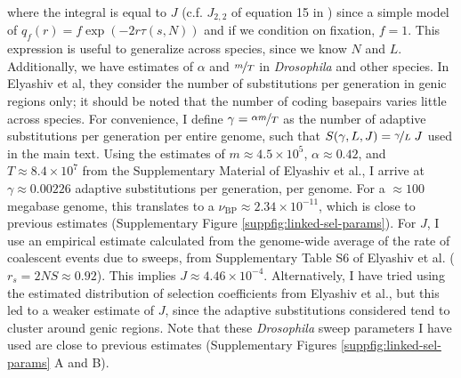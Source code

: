 \documentclass[11pt]{article}
\begin{document}
where the integral is equal to $J$ (c.f. $J_{2,2}$ of equation 15 in
\cite{Coop2012-cd}) since a simple model of $q_f(r) = f \exp(- 2r \tau(s, N))$
and if we condition on fixation, $f = 1$. This expression is useful to
generalize across species, since we know $N$ and $L$. Additionally, we have
estimates of $\alpha$ and $\nicefrac{m}{T}$ in \emph{Drosophila} and other
species. In Elyashiv et al, they consider the number of substitutions per
generation in genic regions only; it should be noted that the number of coding
basepairs varies little across species. For convenience, I define $\gamma =
\nicefrac{\alpha m}{T}$ as the number of adaptive substitutions per generation
per entire genome, such that $S(\gamma, L, J) = \nicefrac{\gamma}{L} \; J$ used
in the main text. Using the estimates of $m \approx 4.5 \times 10^{5}$, $\alpha
\approx 0.42$, and $T \approx 8.4 \times 10^{7}$ from the Supplementary
Material of Elyashiv et al., I arrive at $\gamma \approx 0.00226$ adaptive
substitutions per generation, per genome. For a $\approx 100$ megabase genome,
this translates to a $\nu_\text{BP} \approx 2.34 \times 10^{-11}$, which is
close to previous estimates (Supplementary Figure
\ref{suppfig:linked-sel-params}). For $J$, I use an empirical estimate
calculated from the genome-wide average of the rate of coalescent events due to
sweeps, from Supplementary Table S6 of Elyashiv et al. ($r_s = 2NS \approx
0.92$). This implies $J \approx 4.46 \times 10^{-4}$. Alternatively, I have
tried using the estimated distribution of selection coefficients from Elyashiv
et al., but this led to a weaker estimate of $J$, since the adaptive
substitutions considered tend to cluster around genic regions. Note that these
\emph{Drosophila} sweep parameters I have used are close to previous estimates
(Supplementary Figures \ref{suppfig:linked-sel-params} A and B). 



\end{document}
